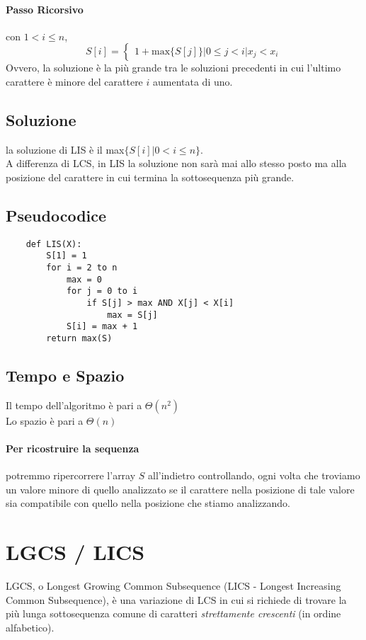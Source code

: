\documentclass[12pt, a4paper, openany]{book}
\begin{document}
\paragraph*{Passo Ricorsivo} con $1<i\leq n$,
$$
S[i] = \begin{cases}
	1+\text{max}\{S[j]\} | 0 \leq j < i | x_j < x_i
\end{cases}
$$
Ovvero, la soluzione è la più grande tra le soluzioni precedenti in cui l'ultimo carattere è minore del carattere $i$ aumentata di uno.
\subsection*{Soluzione}
la soluzione di LIS è il max$\{S[i]| 0 < i \leq n\}$.
\\A differenza di LCS, in LIS la soluzione non sarà mai allo stesso posto ma alla posizione del carattere in cui termina la sottosequenza più grande.
\subsection*{Pseudocodice}
\begin{lstlisting}
	def LIS(X):
		S[1] = 1
		for i = 2 to n
			max = 0
			for j = 0 to i
				if S[j] > max AND X[j] < X[i]
					max = S[j]
			S[i] = max + 1
		return max(S) 

\end{lstlisting}

\subsection*{Tempo e Spazio}
Il tempo dell'algoritmo è pari a $\Theta(n^2)$
\\Lo spazio è pari a $\Theta(n)$

\paragraph*{Per ricostruire la sequenza} potremmo ripercorrere l'array $S$ all'indietro controllando,
ogni volta che troviamo un valore minore di quello analizzato se il carattere nella posizione di tale valore sia compatibile con quello nella posizione che stiamo analizzando.


\section{LGCS / LICS} %
LGCS, o Longest Growing Common Subsequence (LICS - Longest Increasing Common Subsequence), è una variazione di LCS in cui si richiede
di trovare la più lunga sottosequenza comune di caratteri \emph{strettamente crescenti} (in ordine alfabetico).
\end{document}
